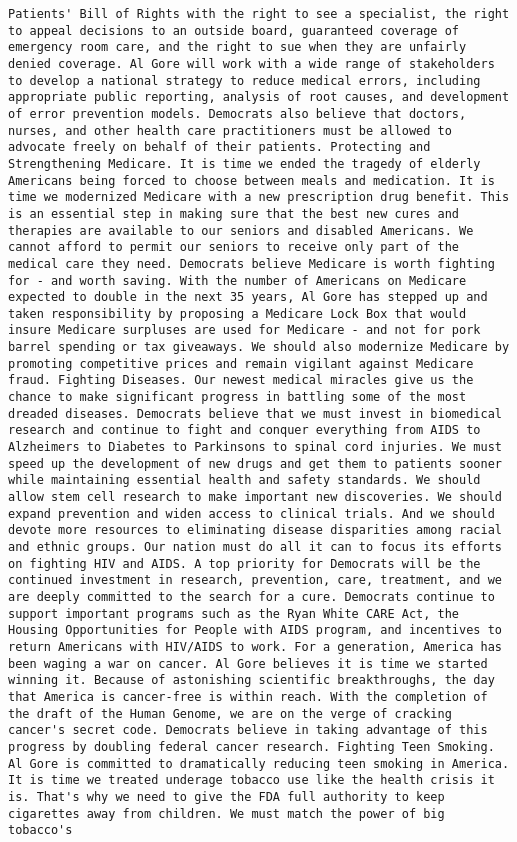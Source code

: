 \documentclass[
]{article}
\begin{document}
\begin{verbatim}
Patients' Bill of Rights with the right to see a specialist, the right to appeal decisions to an outside board, guaranteed coverage of emergency room care, and the right to sue when they are unfairly denied coverage. Al Gore will work with a wide range of stakeholders to develop a national strategy to reduce medical errors, including appropriate public reporting, analysis of root causes, and development of error prevention models. Democrats also believe that doctors, nurses, and other health care practitioners must be allowed to advocate freely on behalf of their patients. Protecting and Strengthening Medicare. It is time we ended the tragedy of elderly Americans being forced to choose between meals and medication. It is time we modernized Medicare with a new prescription drug benefit. This is an essential step in making sure that the best new cures and therapies are available to our seniors and disabled Americans. We cannot afford to permit our seniors to receive only part of the medical care they need. Democrats believe Medicare is worth fighting for - and worth saving. With the number of Americans on Medicare expected to double in the next 35 years, Al Gore has stepped up and taken responsibility by proposing a Medicare Lock Box that would insure Medicare surpluses are used for Medicare - and not for pork barrel spending or tax giveaways. We should also modernize Medicare by promoting competitive prices and remain vigilant against Medicare fraud. Fighting Diseases. Our newest medical miracles give us the chance to make significant progress in battling some of the most dreaded diseases. Democrats believe that we must invest in biomedical research and continue to fight and conquer everything from AIDS to Alzheimers to Diabetes to Parkinsons to spinal cord injuries. We must speed up the development of new drugs and get them to patients sooner while maintaining essential health and safety standards. We should allow stem cell research to make important new discoveries. We should expand prevention and widen access to clinical trials. And we should devote more resources to eliminating disease disparities among racial and ethnic groups. Our nation must do all it can to focus its efforts on fighting HIV and AIDS. A top priority for Democrats will be the continued investment in research, prevention, care, treatment, and we are deeply committed to the search for a cure. Democrats continue to support important programs such as the Ryan White CARE Act, the Housing Opportunities for People with AIDS program, and incentives to return Americans with HIV/AIDS to work. For a generation, America has been waging a war on cancer. Al Gore believes it is time we started winning it. Because of astonishing scientific breakthroughs, the day that America is cancer-free is within reach. With the completion of the draft of the Human Genome, we are on the verge of cracking cancer's secret code. Democrats believe in taking advantage of this progress by doubling federal cancer research. Fighting Teen Smoking. Al Gore is committed to dramatically reducing teen smoking in America. It is time we treated underage tobacco use like the health crisis it is. That's why we need to give the FDA full authority to keep cigarettes away from children. We must match the power of big tobacco's 
\end{verbatim}
\end{document}
